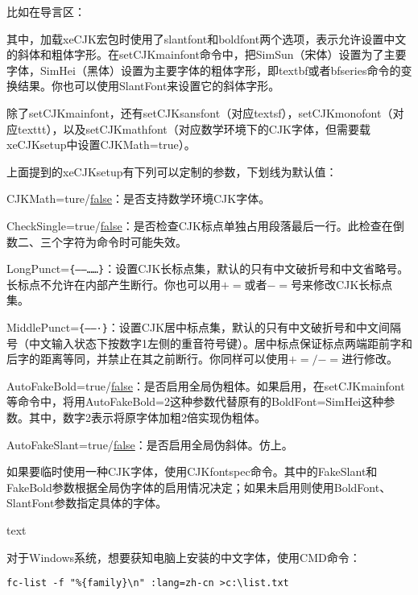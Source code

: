 {比如在导言区：
\begin{latex}{}
\usepackage[slantfont,boldfont]{xeCJK}
\end{latex}

其中，加载xeCJK宏包时使用了slantfont和boldfont两个选项，表示允许设置中文的斜体和粗体字形。在setCJKmainfont命令中，把SimSun（宋体）设置为了主要字体，SimHei（黑体）设置为主要字体的粗体字形，即textbf或者bfseries命令的变换结果。你也可以使用SlantFont来设置它的斜体字形。

除了setCJKmainfont，还有setCJKsansfont（对应textsf），setCJKmonofont（对应texttt），以及setCJKmathfont（对应数学环境下的CJK字体，但需要载xeCJKsetup中设置CJKMath=true）。

上面提到的xeCJKsetup有下列可以定制的参数，下划线为默认值：
\begin{feai}
\item CJKMath=ture/\uline{false}：是否支持数学环境CJK字体。
\item CheckSingle=true/\uline{false}：是否检查CJK标点单独占用段落最后一行。此检查在倒数二、三个字符为命令时可能失效。
\item LongPunct=\verb|{——……}|：设置CJK长标点集，默认的只有中文破折号和中文省略号。长标点不允许在内部产生断行。你也可以用$+=$或者$-=$号来修改CJK长标点集。
\item MiddlePunct=\verb|{——·}|：设置CJK居中标点集，默认的只有中文破折号和中文间隔号（中文输入状态下按数字1左侧的重音符号键）。居中标点保证标点两端距前字和后字的距离等同，并禁止在其之前断行。你同样可以使用$+=/-=$进行修改。
\item AutoFakeBold=true/\uline{false}：是否启用全局伪粗体。如果启用，在setCJKmainfont等命令中，将用AutoFakeBold=2这种参数代替原有的BoldFont=SimHei这种参数。其中，数字2表示将原字体加粗2倍实现伪粗体。
\item AutoFakeSlant=true/\uline{false}：是否启用全局伪斜体。仿上。
\end{feai}

如果要临时使用一种CJK字体，使用CJKfontspec命令。其中的FakeSlant和FakeBold参数根据全局伪字体的启用情况决定；如果未启用则使用BoldFont、SlantFont参数指定具体的字体。
\begin{latex}{}
{ text}
\end{latex}

对于Windows系统，想要获知电脑上安装的中文字体，使用CMD命令：
\begin{verbatim}
fc-list -f "%{family}\n" :lang=zh-cn >c:\list.txt
\end{verbatim}

}
